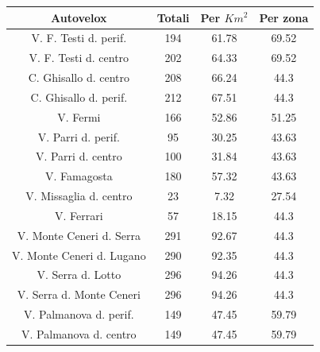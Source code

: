 \documentclass[a4paper]{report}
\begin{document}
\begin{center}
    \def\arraystretch{1.5}%
    \begin{tabular}{ |c|c|c|c| }
        \hline
        Autovelox & Totali & Per $Km^2$ & Per zona \\ 
        \hline
        \rowcolor{TableGray}
        V. F. Testi d. perif.\footnotemark[1]   &   194 &   61.78   &   69.52 \\
        V. F. Testi d. centro                   &   202 &   64.33   &   69.52 \\
        \rowcolor{TableGray}
        C. Ghisallo d. centro\footnotemark[2]   &   208 &   66.24   &   44.3 \\
        C. Ghisallo d. perif.                   &   212 &   67.51   &   44.3 \\
        \rowcolor{TableGray}
        V. Fermi                                &   166 &   52.86   &   51.25 \\
        V. Parri d. perif.                      &    95 &   30.25   &   43.63 \\
        \rowcolor{TableGray}
        V. Parri d. centro                      &   100 &   31.84   &   43.63 \\
        V. Famagosta                            &   180 &   57.32   &   43.63 \\
        \rowcolor{TableGray}
        V. Missaglia d. centro                  &   23  &    7.32   &   27.54 \\
        V. Ferrari                              &   57  &   18.15   &   44.3 \\
        \rowcolor{TableGray}
        V. Monte Ceneri d. Serra                &   291 &   92.67   &   44.3 \\
        V. Monte Ceneri d. Lugano               &   290 &   92.35   &   44.3 \\
        \rowcolor{TableGray}
        V. Serra d. Lotto                       &   296 &   94.26   &   44.3 \\
        V. Serra d. Monte Ceneri                &   296 &   94.26   &   44.3 \\
        \rowcolor{TableGray}
        V. Palmanova d. perif.                  &   149 &   47.45   &   59.79 \\
        V. Palmanova d. centro                  &   149 &   47.45   &   59.79 \\
        \hline
    \end{tabular}
\end{center}
\end{document}
